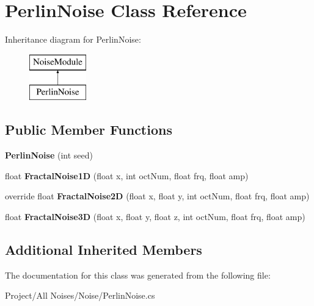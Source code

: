\hypertarget{class_perlin_noise}{}\section{Perlin\+Noise Class Reference}
\label{class_perlin_noise}
Inheritance diagram for Perlin\+Noise\+:\begin{figure}[H]
\begin{center}
\leavevmode
\includegraphics[height=2.000000cm]{class_perlin_noise}
\end{center}
\end{figure}
\subsection*{Public Member Functions}
\begin{DoxyCompactItemize}
\item 
\mbox{\label{class_perlin_noise_ac14b2a75496fa726a113b01c52b81279}} 
{\bfseries Perlin\+Noise} (int seed)
\item 
\mbox{\label{class_perlin_noise_afd838a3594e55a953557fbecae3c3c09}} 
float {\bfseries Fractal\+Noise1D} (float x, int oct\+Num, float frq, float amp)
\item 
\mbox{\label{class_perlin_noise_a5006a6d875ca81f46c597a8846fa7fd8}} 
override float {\bfseries Fractal\+Noise2D} (float x, float y, int oct\+Num, float frq, float amp)
\item 
\mbox{\label{class_perlin_noise_a9aac3d4201b63e1b28fe62c4b76e51dd}} 
float {\bfseries Fractal\+Noise3D} (float x, float y, float z, int oct\+Num, float frq, float amp)
\end{DoxyCompactItemize}
\subsection*{Additional Inherited Members}


The documentation for this class was generated from the following file\+:\begin{DoxyCompactItemize}
\item 
Project/\+All Noises/\+Noise/Perlin\+Noise.\+cs\end{DoxyCompactItemize}
